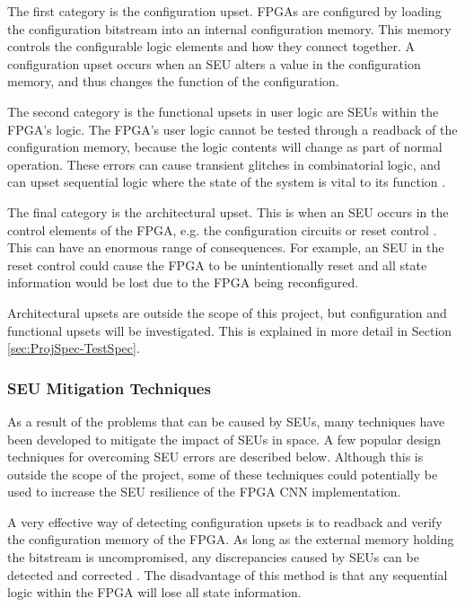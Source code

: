 \documentclass[12pt]{article}
\begin{document}
The first category is the configuration upset. FPGAs are configured by loading the configuration bitstream into an internal configuration memory. This memory controls the configurable logic elements and how they connect together. A configuration upset occurs when an SEU alters a value in the configuration memory, and thus changes the function of the configuration. 

The second category is the functional upsets in user logic are SEUs within the FPGA's logic. The FPGA's user logic cannot be tested through a readback of the configuration memory, because the logic contents will change as part of normal operation. These errors can cause transient glitches in combinatorial logic, and can upset sequential logic where the state of the system is vital to its function \cite{FTripleMR}.

The final category is the architectural upset. This is when an SEU occurs in the control elements of the FPGA, e.g. the configuration circuits or reset control \cite{SuitabilityGaisler}. This can have an enormous range of consequences. For example, an SEU in the reset control could cause the FPGA to be unintentionally reset and all state information would be lost due to the FPGA being reconfigured.

Architectural upsets are outside the scope of this project, but configuration and functional upsets will be investigated. This is explained in more detail in Section \ref{sec:ProjSpec-TestSpec}.

\subsubsection{SEU Mitigation Techniques}
\label{sec:Background-FPGAsAndSpaceApplications-Mitigation}


As a result of the problems that can be caused by SEUs, many techniques have been developed to mitigate the impact of SEUs in space. A few popular design techniques for overcoming SEU errors are described below. Although this is outside the scope of the project, some of these techniques could potentially be used to increase the SEU resilience of the FPGA CNN implementation.

A very effective way of detecting configuration upsets is to readback and verify the configuration memory of the FPGA. As long as the external memory holding the bitstream is uncompromised, any discrepancies caused by SEUs can be detected and corrected \cite{SuitabilityGaisler}. The disadvantage of this method is that any sequential logic within the FPGA will lose all state information.
\end{document}
